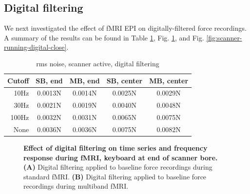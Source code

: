 \documentclass[letterpaper, 10 pt, conference]{ieeeconf}  %
\begin{document}
\subsection{Digital filtering}

We next investigated the effect of fMRI EPI on digitally-filtered force recordings. A summary of the results can be found in Table \ref{table:scanner-running-digital}, Fig. \ref{fig:scanner-running-digital}, and Fig. \ref{fig:scanner-running-digital-close}.

\begin{table}[h]
\caption{rms noise, scanner active, digital filtering}
\label{table:scanner-running-digital}
\begin{center}
\begin{tabular}{|r||c|c||c|c|}
\hline
\textbf{Cutoff} & \textbf{SB, end} & \textbf{MB, end} & \textbf{SB, center} & \textbf{MB, center}\\
\hline
10Hz & 0.0013N & 0.0014N & 0.0025N & 0.0029N\\
\hline
30Hz & 0.0021N & 0.0019N & 0.0040N & 0.0048N\\
\hline
100Hz & 0.0032N & 0.0031N & 0.0065N & 0.0075N\\
\hline
None & 0.0036N & 0.0036N & 0.0075N & 0.0082N\\
\hline

\end{tabular}
\end{center}
\end{table}

\begin{figure}[thpb]
  \centering
  \caption{\textbf{Effect of digital filtering on time series and frequency response during fMRI, keyboard at end of scanner bore.} \textbf{(A)} Digital filtering applied to baseline force recordings during standard fMRI. \textbf{(B)} Digital filtering applied to baseline force recordings during multiband fMRI.}
  \label{fig:scanner-running-digital}
\end{figure}
\end{document}
